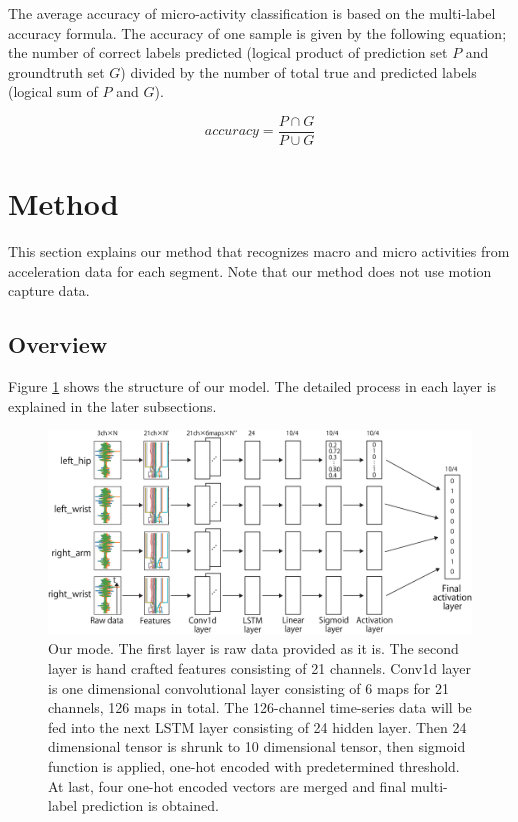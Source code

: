 \documentclass{svmult}
\begin{document}
The average accuracy of micro-activity classification is based on the multi-label accuracy formula. The accuracy of one sample is given by the following equation; the number of correct labels predicted (logical product of prediction set $P$ and groundtruth set $G$) divided by the number of total true and predicted labels (logical sum of $P$ and $G$).

\begin{equation}
    accuracy = \frac{P\cap G}{P\cup G}
\end{equation}

\section{Method}
\label{sec:method}
This section explains our method that recognizes macro and micro activities from acceleration data for each segment. Note that our method does not use motion capture data.

\subsection{Overview}
Figure \ref{fig:model} shows the structure of our model. The detailed process in each layer is explained in the later subsections. 
\begin{figure}[h]
\sidecaption[t]
\includegraphics[width=1\linewidth]{Figure_1}
\caption{Our mode. The first layer is raw data provided as it is. The second layer is hand crafted features consisting of 21 channels. Conv1d layer is one dimensional convolutional layer consisting of 6 maps for 21 channels, 126 maps in total. The 126-channel time-series data will be fed into the next LSTM layer consisting of 24 hidden layer. Then 24 dimensional tensor is shrunk to 10 dimensional tensor, then sigmoid function is applied, one-hot encoded with predetermined threshold. At last, four one-hot encoded vectors are merged and final multi-label prediction is obtained.}
\label{fig:model}
\end{figure}
\end{document}
